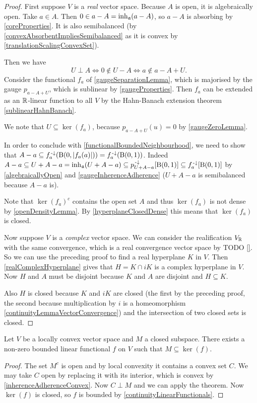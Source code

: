 \begin{proof}
First suppose $V$ is a \emph{real} vector space. Because $A$ is open, it is algebraically open. Take $a\in A$. Then $0\in a-A = \operatorname{inh}_{\mathfrak{a}}(a-A)$, so $a-A$ is absorbing by \ref{coreProperties}. It is also semibalanced (by \ref{convexAbsorbentImpliesSemibalanced} as it is convex by \ref{translationScalingConvexSet}).

Then we have
\[ U\perp A \iff 0\notin U-A \iff a \notin a-A+U. \]
Consider the functional $f_{a}$ of \ref{gaugeSeparationLemma}, which is majorised by the gauge $p_{a-A+U}$, which is sublinear by \ref{gaugeProperties}. Then $f_a$ can be extended as an $\mathbb{R}$-linear function to all $V$ by the Hahn-Banach extension theorem \ref{sublinearHahnBanach}.

We note that $U\subseteq \ker(f_a)$, because $p_{a-A+U}(u) = 0$ by \ref{gaugeZeroLemma}.

In order to conclude with \ref{functionalBoundedNeighbourhood}, we need to show that $A-a \subseteq f_a^{{\text{\hspace{0.15em}-}\downarrow}}(\operatorname{B}(0,|f_a(a)|)) = f_a^{{\text{\hspace{0.15em}-}\downarrow}}(\operatorname{B}(0,1))$.
Indeed $A-a \subseteq U+A-a = \operatorname{inh}_\mathfrak{a}(U+A-a) \subseteq p_{U+A-a}^{\text{\hspace{0.15em}-}\downarrow}[\operatorname{B}(0,1)] \subseteq f_{a}^{\text{\hspace{0.15em}-}\downarrow}[\operatorname{B}(0,1)]$ by \ref{algebraicallyOpen} and \ref{gaugeInherenceAdherence} ($U+A-a$ is semibalanced because $A-a$ is).

Note that $\ker(f_a)^c$ contains the open set $A$ and thus $\ker(f_a)$ is not dense by \ref{openDensityLemma}. By \ref{hyperplaneClosedDense} this means that $\ker(f_a)$ is closed.

Now suppose $V$ is a \emph{complex} vector space. We can consider the realification $V_{\mathbb{R}}$ with the same convergence, which is a real convergence vector space by TODO \ref{}. So we can use the preceding proof to find a real hyperplane $K$ in $V$. Then \ref{realComplexHyperplane} gives that $H = K\cap iK$ is a complex hyperplane in $V$. Now $H$ and $A$ must be disjoint because $K$ and $A$ are disjoint and $H \subseteq K$.

Also $H$ is closed because $K$ and $iK$ are closed (the first by the preceding proof, the second because multiplication by $i$ is a homeomorphism \ref{continuityLemmaVectorConvergence}) and the intersection of two closed sets is closed.
\end{proof}
\begin{corollary} \label{functionalZeroOnClosedSubSpace}
Let $V$ be a locally convex vector space and $M$ a closed subspace. There exists a non-zero bounded linear functional $f$ on $V$ such that $M\subseteq \ker(f)$.
\end{corollary}
\begin{proof}
The set $M^c$ is open and by local convexity it contains a convex set $C$. We may take $C$ open by replacing it with its interior, which is convex by \ref{inherenceAdherenceConvex}. Now $C\perp M$ and we can apply the theorem. Now $\ker(f)$ is closed, so $f$ is bounded by \ref{continuityLinearFunctionals}.
\end{proof}

